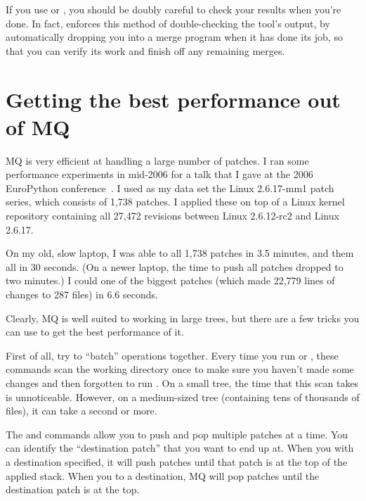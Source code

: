 If you use  or , you should be doubly
careful to check your results when you're done.  In fact,
 enforces this method of double-checking the tool's
output, by automatically dropping you into a merge program when it has
done its job, so that you can verify its work and finish off any
remaining merges.

\section{Getting the best performance out of MQ}
\label{sec:mq:perf}

MQ is very efficient at handling a large number of patches.  I ran
some performance experiments in mid-2006 for a talk that I gave at the
2006 EuroPython conference~\cite{web:europython}.  I used as my data
set the Linux 2.6.17-mm1 patch series, which consists of 1,738
patches.  I applied these on top of a Linux kernel repository
containing all 27,472 revisions between Linux 2.6.12-rc2 and Linux
2.6.17.

On my old, slow laptop, I was able to
 all 1,738 patches in 3.5 minutes,
and  them all in 30 seconds.  (On a
newer laptop, the time to push all patches dropped to two minutes.)  I
could  one of the biggest patches (which made 22,779
lines of changes to 287 files) in 6.6 seconds.

Clearly, MQ is well suited to working in large trees, but there are a
few tricks you can use to get the best performance of it.

First of all, try to ``batch'' operations together.  Every time you
run  or , these commands scan the working
directory once to make sure you haven't made some changes and then
forgotten to run .  On a small tree, the time that
this scan takes is unnoticeable.  However, on a medium-sized tree
(containing tens of thousands of files), it can take a second or more.

The  and  commands allow you to push and pop
multiple patches at a time.  You can identify the ``destination
patch'' that you want to end up at.  When you  with a
destination specified, it will push patches until that patch is at the
top of the applied stack.  When you  to a destination, MQ
will pop patches until the destination patch is at the top.

